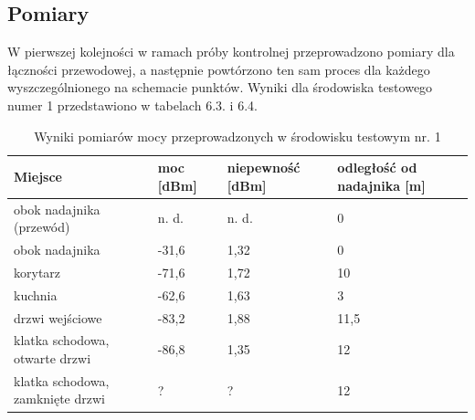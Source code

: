 \documentclass[12pt, twoside, openany]{mwrep}
\begin{document}
\subsection{Pomiary}
W pierwszej kolejności w ramach próby kontrolnej przeprowadzono pomiary dla łączności przewodowej, a następnie powtórzono ten sam proces dla każdego wyszczególnionego na schemacie punktów. Wyniki dla środowiska testowego numer 1 przedstawiono w tabelach 6.3. i 6.4.
\begin{table}[H]
\begin{tabular}{|l|l|l|l|}
\hline
Miejsce                          & moc {[}dBm{]} & niepewność   {[}dBm{]} & odległość   od nadajnika {[}m{]} \\ \hline
obok nadajnika (przewód)         & n. d.         & n. d.                  & 0                                \\ \hline
obok nadajnika                   & -31,6           & 1,32            & 0                                \\ \hline
korytarz                         & -71,6           & 1,72            & 10                               \\ \hline
kuchnia                          & -62,6           & 1,63            & 3                                \\ \hline
drzwi wejściowe                  & -83,2           & 1,88            & 11,5                             \\ \hline
klatka schodowa, otwarte drzwi   & -86,8           & 1,35            & 12                               \\ \hline
klatka schodowa, zamknięte drzwi & ?             & ?                      & 12                               \\ \hline
\end{tabular}
\caption{Wyniki pomiarów mocy przeprowadzonych w środowisku testowym nr. 1}
\end{table}
\end{document}
